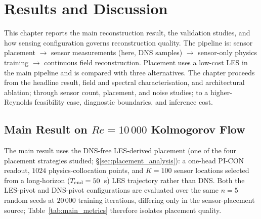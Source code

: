 \chapter{Results and Discussion}
\label{ch:results}

This chapter reports the main reconstruction result, the validation studies, and how sensing configuration governs reconstruction quality. The pipeline is: sensor placement $\to$ sensor measurements (here, DNS samples) $\to$ sensor-only physics training $\to$ continuous field reconstruction. Placement uses a low-cost LES in the main pipeline and is compared with three alternatives. The chapter proceeds from the headline result, field and spectral characterisation, and architectural ablation; through sensor count, placement, and noise studies; to a higher-Reynolds feasibility case, diagnostic boundaries, and inference cost.

\section{Main Result on $Re=10\,000$ Kolmogorov Flow}
\label{sec:main_result}

The main result uses the DNS-free LES-derived placement (one of the four placement strategies studied; \S\ref{sec:placement_analysis}): a one-head PI-CON readout, $1024$ physics-collocation points, and $K=100$ sensor locations selected from a long-horizon ($T_{\rm end}=50$~s) LES trajectory rather than DNS. Both the LES-pivot and DNS-pivot configurations are evaluated over the same $n=5$ random seeds at $20\,000$ training iterations, differing only in the sensor-placement source; Table~\ref{tab:main_metrics} therefore isolates placement quality.

